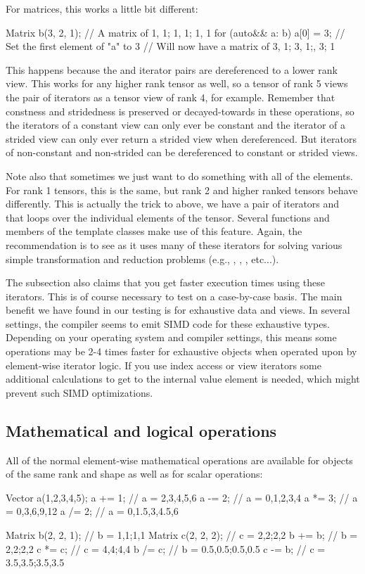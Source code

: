 For matrices, this works a little bit different:
\begin{code}
Matrix b(3, 2, 1); // A matrix of {1, 1; 1, 1; 1, 1}
for (auto&& a: b) {
  a[0] = 3;  // Set the first element of "a" to 3
}  // Will now have a matrix of {3, 1; 3, 1;, 3; 1}
\end{code}
This happens because the  and 
iterator pairs are dereferenced to a lower rank view.
This works for any higher rank tensor as well, so a tensor of rank 5 views
the pair of iterators as a tensor view of rank 4, for example.
Remember that constness and stridedness is preserved or decayed-towards in these operations, so the
iterators of a constant view can only ever be constant and the iterator of a 
strided view can only ever return a strided view when dereferenced.  But iterators of non-constant
and non-strided can be dereferenced to constant or strided views.

Note also that sometimes we just want to do something with all of the elements.  For rank 1 tensors, this is the same,
but rank 2 and higher ranked tensors behave differently.
This is actually the trick to  above, we have a pair of iterators  and 
that loops over the individual elements of the tensor.
Several functions and members of the template classes make use of this feature.  Again, the recommendation is to see  as it uses many of these iterators for solving various simple 
transformation and reduction problems (e.g., , , , etc...). 

The subsection also claims that you get faster execution times using these iterators.  This is of course necessary to
test on a case-by-case basis.  The main benefit we have found in our testing is for exhaustive data and views.  In
several settings, the compiler seems to emit SIMD code for these exhaustive types.  Depending on your operating
system and compiler settings, this means some operations may be 2-4 times faster for exhaustive objects when
operated upon by element-wise iterator logic.  If you use index access or view iterators some additional calculations
to get to the internal value element is needed, which might prevent such SIMD optimizations.

\subsection{Mathematical and logical operations}
All of the normal element-wise mathematical operations are available for objects of the same rank and shape as well as for scalar operations:
\begin{code}
Vector a({1,2,3,4,5});
a += 1;  // a = {2,3,4,5,6}
a -= 2;  // a = {0,1,2,3,4}
a *= 3;  // a = {0,3,6,9,12}
a /= 2;  // a = {0,1.5,3,4.5,6}

Matrix b(2, 2, 1);  // b = {1,1;1,1}
Matrix c(2, 2, 2);  // c = {2,2;2,2}
b += b;  // b = {2,2;2,2}
c *= c;  // c = {4,4;4,4}
b /= c;  // b = {0.5,0.5;0.5,0.5}
c -= b;  // c = {3.5,3.5;3.5,3.5}
\end{code}

